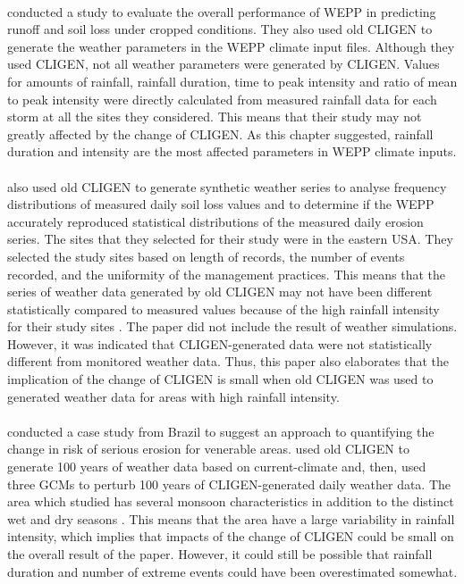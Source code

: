 \paragraph{\citet{zhang1996-855}} conducted a study to evaluate the overall
performance of
WEPP in predicting runoff and soil loss under cropped conditions. They also used
old CLIGEN to generate the weather parameters in the WEPP climate input files.
Although they used CLIGEN, not all weather parameters were generated by CLIGEN.
Values for amounts of rainfall, rainfall duration, time to peak intensity and
ratio of mean to peak intensity were directly calculated from measured rainfall
data for each storm at all the sites they considered. This means that their
study may not greatly affected by the change of CLIGEN. As this chapter
suggested, rainfall duration and intensity are the most affected parameters in
WEPP climate inputs.

\paragraph{\citet{baffaut1998-756}} also used old CLIGEN to generate synthetic
weather
series to analyse frequency distributions of measured daily soil loss values and
to determine if the WEPP accurately reproduced statistical distributions of the
measured daily erosion series. The sites that they selected for their study
were in the eastern USA. They selected the study sites based on length of
records, the number of events recorded, and the uniformity of the management
practices. This means that the series of weather data generated by old CLIGEN
may not have been different statistically compared to measured values because
of the high rainfall intensity for their study sites \citep{ashley2003-3003}.
The paper did not include the result of weather simulations. However, it
was indicated that CLIGEN-generated data were not statistically different from
monitored weather data. Thus, this paper also elaborates that the implication of
the change of CLIGEN is small when old CLIGEN was used to generated weather
data for areas with high rainfall intensity.

\paragraph{\citet{favis-mortlock1999-329}} conducted a case study from Brazil to
suggest an
approach to quantifying the change in risk of serious erosion for venerable
areas. \citet{favis-mortlock1999-329} used old CLIGEN to generate 100 years of
weather data based on current-climate and, then, used three GCMs to perturb 100
years of CLIGEN-generated daily weather data. The area which
\citet{favis-mortlock1999-329} studied has several monsoon characteristics in
addition to the distinct wet and dry seasons \citep{gan2004-47}. This means
that the area have a large variability in rainfall intensity, which implies
that impacts of the change of CLIGEN could be small on the overall result of the
paper. However, it could still be possible that rainfall duration and number of
extreme events could have been overestimated somewhat.

